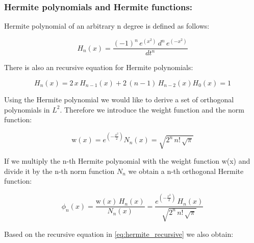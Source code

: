 \documentclass[12pt,twoside,a4paper]{article}
\numberwithin{equation}{subsection}
\numberwithin{figure}{subsection}
\begin{document}
\subsubsection*{Hermite polynomials and Hermite functions:}

Hermite polynomial of an arbitrary n degree is defined as follows:

\begin{equation} \label{eq:hermite_definition}
 {H_{n}}(x)=\frac {( - 1)^{n}\,e^{(x^{2})}\,d^{n}\,e^{( - x^{2})} }{dt^{n}}
\end{equation}

There is also an recursive equation for Hermite polynomials:

\begin{subequations} \label{eq:hermite_recursive}
  \begin{equation}   \label{eq:hrec_next}
    {H_{n}}(x)=2\,x\,{H_{n - 1}}(x) + 2\,(n - 1)\,{H_{n - 2}}(x)
  \end{equation}
  \begin{equation}   \label{eq:hrec_first}
    {H_{0}}(x)=1
  \end{equation}
\end{subequations}

Using the Hermite polynomial we would like to derive a set of orthogonal polynomials in $L^{2}$. Therefore we introduce the
weight function and the norm function:

\begin{subequations} \label{eq:hermite_weight}
  \begin{equation}   \label{eq:hwht_weight}
    \mathrm{w}(x)=e^{( - \frac {x^{2}}{2})}
  \end{equation}
  \begin{equation}   \label{eq:hwht_iter}
    {N_{n}}(x)=\sqrt{2^{n}\,n\mathrm{!}\,\sqrt{\pi }}
  \end{equation}
\end{subequations}

If we multiply the n-th Hermite polynomial with the weight function w(x) and divide it by the n-th norm function ${N_{n}}$ we
obtain a n-th orthogonal Hermite function:

\begin{equation} \label{eq:hermite_orthogonal}
  {\phi_{n}}(x)=\frac {\mathrm{w}(x)\,{H_{n}}(x)}{{N_{n}}(x)} = \frac {e^{( - \frac {x^{2}}{2})}\,{H_{n}}(x)}{\sqrt{2^{n}\,n
\mathrm{!}\,\sqrt{\pi }}}
\end{equation}

Based on the recursive equation in \ref{eq:hermite_recursive} we also obtain:
\end{document}
